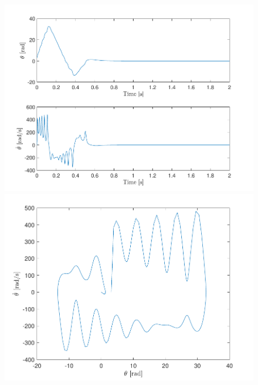 \documentclass[10pt]{article}
\begin{document}
\begin{figure}[ht]
    \centering
    \begin{minipage}[b]{0.45\textwidth}
        \centering
        \includegraphics[clip,width=1\linewidth]{lab1/figs/section7_controlled_state_evolution_x_0_5.pdf}
    \end{minipage}
    \begin{minipage}[b]{0.45\textwidth}
        \centering
        \includegraphics[clip,width=1\linewidth]{lab1/figs/section7_controlled_state_orbit_x_0_5.pdf}
    \end{minipage}
\end{figure}
\end{document}
